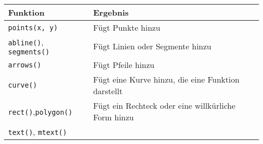 \documentclass[
]{book}
\begin{document}
\begin{longtable}[]{@{}ll@{}}
\toprule
\begin{minipage}[b]{0.24\columnwidth}\raggedright
Funktion\strut
\end{minipage} & \begin{minipage}[b]{0.71\columnwidth}\raggedright
Ergebnis\strut
\end{minipage}\tabularnewline
\midrule
\endhead
\begin{minipage}[t]{0.24\columnwidth}\raggedright
\texttt{points(x,\ y)}\strut
\end{minipage} & \begin{minipage}[t]{0.71\columnwidth}\raggedright
Fügt Punkte hinzu\strut
\end{minipage}\tabularnewline
\begin{minipage}[t]{0.24\columnwidth}\raggedright
\texttt{abline()}, \texttt{segments()}\strut
\end{minipage} & \begin{minipage}[t]{0.71\columnwidth}\raggedright
Fügt Linien oder Segmente hinzu\strut
\end{minipage}\tabularnewline
\begin{minipage}[t]{0.24\columnwidth}\raggedright
\texttt{arrows()}\strut
\end{minipage} & \begin{minipage}[t]{0.71\columnwidth}\raggedright
Fügt Pfeile hinzu\strut
\end{minipage}\tabularnewline
\begin{minipage}[t]{0.24\columnwidth}\raggedright
\texttt{curve()}\strut
\end{minipage} & \begin{minipage}[t]{0.71\columnwidth}\raggedright
Fügt eine Kurve hinzu, die eine Funktion darstellt\strut
\end{minipage}\tabularnewline
\begin{minipage}[t]{0.24\columnwidth}\raggedright
\texttt{rect()},\texttt{polygon()}\strut
\end{minipage} & \begin{minipage}[t]{0.71\columnwidth}\raggedright
Fügt ein Rechteck oder eine willkürliche Form hinzu\strut
\end{minipage}\tabularnewline
\begin{minipage}[t]{0.24\columnwidth}\raggedright
\texttt{text()}, \texttt{mtext()}\strut
\end{minipage} & \begin{minipage}[t]{0.71\columnwidth}\raggedright

\end{minipage}
\end{longtable}
\end{document}
